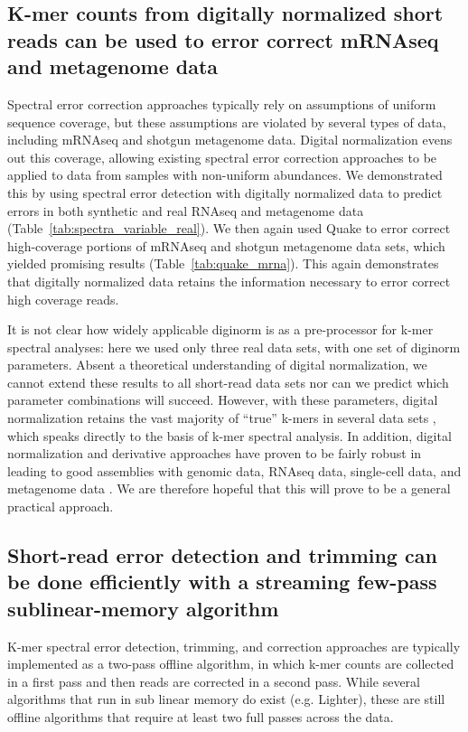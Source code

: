 \documentclass{article}
\begin{document}
\subsection{K-mer counts from digitally normalized short reads can be used to error correct mRNAseq and metagenome data}

Spectral error correction approaches typically rely on assumptions of
uniform sequence coverage, but these assumptions are violated by
several types of data, including mRNAseq and shotgun metagenome data.
Digital normalization evens out this coverage, allowing existing
spectral error correction approaches to be applied to data from
samples with non-uniform abundances.  We demonstrated this by using
spectral error detection with digitally normalized data to predict
errors in both synthetic and real RNAseq and metagenome data
(Table~\ref{tab:spectra_variable_real}).  We then again used Quake to
error correct high-coverage portions of mRNAseq and shotgun metagenome
data sets, which yielded promising results
(Table~\ref{tab:quake_mrna}).  This again demonstrates that digitally
normalized data retains the information necessary to error correct
high coverage reads.

It is not clear how widely applicable diginorm is as a pre-processor
for k-mer spectral analyses: here we used only three real data sets,
with one set of diginorm parameters.  Absent a theoretical
understanding of digital normalization, we cannot extend these results
to all short-read data sets nor can we predict which parameter
combinations will succeed.  However, with these parameters, digital
normalization retains the vast majority of ``true'' k-mers in several
data sets \cite{Brown2012}, which speaks directly to the basis of
k-mer spectral analysis.  In addition, digital normalization and
derivative approaches have proven to be fairly robust in leading to
good assemblies with genomic data, RNAseq data, single-cell data, and
metagenome data \cite{Brown2012,Lowe2015,Howe2014}.  We are therefore
hopeful that this will prove to be a general practical approach.


\subsection{Short-read error detection and trimming can be done efficiently with a streaming few-pass sublinear-memory algorithm}

K-mer spectral error detection, trimming, and correction approaches
are typically implemented as a two-pass offline algorithm, in which
k-mer counts are collected in a first pass and then reads are
corrected in a second pass.  While several algorithms that run in sub
linear memory do exist (e.g. Lighter), these are still offline
algorithms that require at least two full passes across the data.
\end{document}
